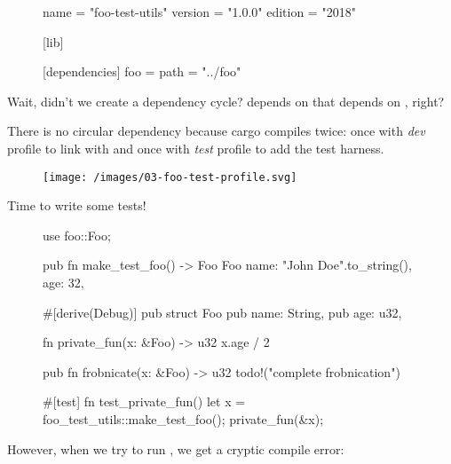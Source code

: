 \documentclass{article}
\begin{document}
\begin{figure}
\begin{code}[good]
[package]
name = "foo-test-utils"
version = "1.0.0"
edition = "2018"

[lib]

[dependencies]
foo = { path = "../foo" }
\end{code}
\end{figure}

Wait, didn't we create a dependency cycle?
 depends on  that depends on , right?

There is no circular dependency because cargo compiles  twice: once with \emph{dev} profile to link with  and once with \emph{test} profile to add the test harness.

\begin{figure}[grayscale-diagram]
  \texttt{[image: /images/03-foo-test-profile.svg]}
\end{figure}

Time to write some tests!

\begin{figure}
\begin{code}[good]
use foo::Foo;

pub fn make_test_foo() -> Foo {
    Foo {
        name: "John Doe".to_string(),
        age: 32,
    }
}
\end{code}
\end{figure}

\begin{figure}
\begin{code}[bad]
#[derive(Debug)]
pub struct Foo {
    pub name: String,
    pub age: u32,
}

fn private_fun(x: &Foo) -> u32 {
    x.age / 2
}

pub fn frobnicate(x: &Foo) -> u32 {
    todo!("complete frobnication")
}

#[test]
fn test_private_fun() {
    let x = foo_test_utils::make_test_foo();
    private_fun(&x);
}
\end{code}
\end{figure}

However, when we try to run , we get a cryptic compile error:
\end{document}
